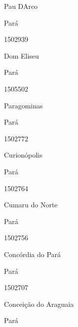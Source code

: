 \documentclass[
  letterpaper,
]{report}
\begin{document}
Pau D\textquotesingle Arco

\n    

\n    

\n      

Pará

\n      

1502939

\n      

Dom Eliseu

\n    

\n    

\n      

Pará

\n      

1505502

\n      

Paragominas

\n    

\n    

\n      

Pará

\n      

1502772

\n      

Curionópolis

\n    

\n    

\n      

Pará

\n      

1502764

\n      

Cumaru do Norte

\n    

\n    

\n      

Pará

\n      

1502756

\n      

Concórdia do Pará

\n    

\n    

\n      

Pará

\n      

1502707

\n      

Conceição do Araguaia

\n    

\n    

\n      

Pará
\end{document}
